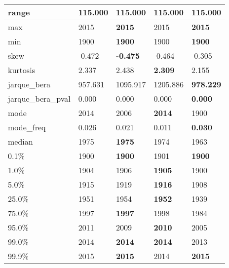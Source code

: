 \begin{table}[H]
\begin{tabular}{|l|m{10em}|m{10em}|m{10em}|m{10em}|}
\hline range & 115.000 & 115.000 & 115.000 & 115.000 \\
\hline max & 2015 & \bfseries 2015 & \cellcolor[rgb]{0.9, 0.54, 0.52} 2015 & \bfseries 2015 \\
\hline min & 1900 & \bfseries 1900 & \cellcolor[rgb]{0.9, 0.54, 0.52} 1900 & \bfseries 1900 \\
\hline skew & -0.472 & \bfseries -0.475 & -0.464 & \cellcolor[rgb]{0.9, 0.54, 0.52} -0.305 \\
\hline kurtosis & 2.337 & 2.438 & \bfseries 2.309 & \cellcolor[rgb]{0.9, 0.54, 0.52} 2.155 \\
\hline jarque\_bera & 957.631 & 1095.917 & \cellcolor[rgb]{0.9, 0.54, 0.52} 1205.886 & \bfseries 978.229 \\
\hline jarque\_bera\_pval & 0.000 & \cellcolor[rgb]{0.9, 0.54, 0.52} 0.000 & \cellcolor[rgb]{0.9, 0.54, 0.52} 0.000 & \bfseries 0.000 \\
\hline mode & 2014 & 2006 & \bfseries 2014 & \cellcolor[rgb]{0.9, 0.54, 0.52} 1900 \\
\hline mode\_freq & 0.026 & 0.021 & \cellcolor[rgb]{0.9, 0.54, 0.52} 0.011 & \bfseries 0.030 \\
\hline median & 1975 & \bfseries 1975 & 1974 & \cellcolor[rgb]{0.9, 0.54, 0.52} 1963 \\
\hline 0.1\% & 1900 & \bfseries 1900 & \cellcolor[rgb]{0.9, 0.54, 0.52} 1901 & \bfseries 1900 \\
\hline 1.0\% & 1904 & 1906 & \bfseries 1905 & \cellcolor[rgb]{0.9, 0.54, 0.52} 1900 \\
\hline 5.0\% & 1915 & 1919 & \bfseries 1916 & \cellcolor[rgb]{0.9, 0.54, 0.52} 1908 \\
\hline 25.0\% & 1951 & 1954 & \bfseries 1952 & \cellcolor[rgb]{0.9, 0.54, 0.52} 1939 \\
\hline 75.0\% & 1997 & \bfseries 1997 & 1998 & \cellcolor[rgb]{0.9, 0.54, 0.52} 1984 \\
\hline 95.0\% & 2011 & 2009 & \bfseries 2010 & \cellcolor[rgb]{0.9, 0.54, 0.52} 2005 \\
\hline 99.0\% & 2014 & \bfseries 2014 & \bfseries 2014 & \cellcolor[rgb]{0.9, 0.54, 0.52} 2013 \\
\hline 99.9\% & 2015 & \bfseries 2015 & \cellcolor[rgb]{0.9, 0.54, 0.52} 2014 & \bfseries 2015 \\
\hline
\end{tabular}
\end{table}
